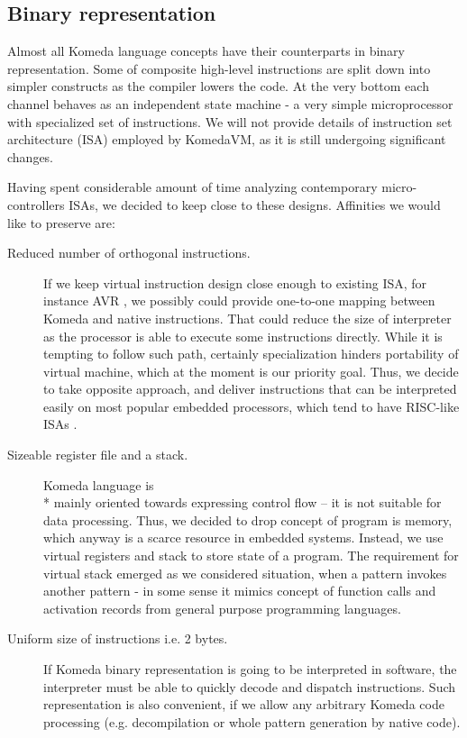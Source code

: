 \documentclass{article}
\begin{document}
\subsection{Binary representation}

Almost all Komeda language concepts have their counterparts in binary
representation. Some of composite high-level instructions are split down into
simpler constructs as the compiler lowers the code. At the very bottom each
channel behaves as an independent state machine - a very simple microprocessor
with specialized set of instructions. We will not provide details of
instruction set architecture (ISA) employed by KomedaVM, as it is still
undergoing significant changes.

Having spent considerable amount of time analyzing contemporary
micro-controllers ISAs, we decided to keep close to these designs. Affinities we
would like to preserve are:

\begin{description}
  \item[Reduced number of orthogonal instructions.]If we keep virtual instruction
    design close enough to existing ISA, for instance AVR \cite{avr}, we possibly
    could provide one-to-one mapping between Komeda and native instructions. That
    could reduce the size of interpreter as the processor is able to execute some
    instructions directly. While it is tempting to follow such path, certainly
    specialization hinders portability of virtual machine, which at the moment is
    our priority goal. Thus, we decide to take opposite approach, and deliver
    instructions that can be interpreted easily on most popular embedded
    processors, which tend to have RISC-like ISAs \cite{risc}.

  \item[Sizeable register file and a stack.] Komeda language is \\* mainly
    oriented towards expressing control flow -- it is not suitable for data
    processing.  Thus, we decided to drop concept of program is memory, which
    anyway is a scarce resource in embedded systems. Instead, we use virtual
    registers and stack to store state of a program. The requirement for
    virtual stack emerged as we considered situation, when a pattern invokes
    another pattern - in some sense it mimics concept of function calls and
    activation records from general purpose programming languages.

  \item[Uniform size of instructions i.e. 2 bytes.] If Komeda binary
    representation is going to be interpreted in software, the interpreter must
    be able to quickly decode and dispatch instructions. Such representation is
    also convenient, if we allow any arbitrary Komeda code processing (e.g.
    decompilation or whole pattern generation by native code).
\end{description}
\end{document}
